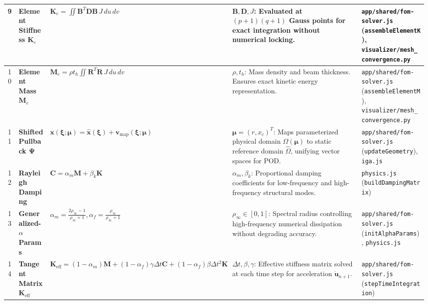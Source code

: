 \begin{landscape}
\begin{center}
\begin{longtable}{|c|p{3.5cm}|p{6cm}|p{6cm}|p{6cm}|}
9 & \textbf{Element Stiffness $\mathbf{K}_e$} & $\mathbf{K}_e = \iint \mathbf{B}^T \mathbf{D} \mathbf{B} \, J \, du \, dv$ & $\mathbf{B}, \mathbf{D}, J$: Evaluated at $(p+1)(q+1)$ Gauss points for exact integration without numerical locking. & \texttt{app/shared/fom-solver.js} (\texttt{assembleElementK}), \texttt{visualizer/mesh\_convergence.py} \\
\hline

10 & \textbf{Element Mass $\mathbf{M}_e$} & $\mathbf{M}_e = \rho t_h \iint \mathbf{R}^T \mathbf{R} \, J \, du \, dv$ & $\rho, t_h$: Mass density and beam thickness. Ensures exact kinetic energy representation. & \texttt{app/shared/fom-solver.js} (\texttt{assembleElementM}), \texttt{visualizer/mesh\_convergence.py} \\
\hline

11 & \textbf{Shifted Pullback $\boldsymbol{\Psi}$} & $\mathbf{x}(\boldsymbol{\xi}; \boldsymbol{\mu}) = \hat{\mathbf{x}}(\boldsymbol{\xi}) + \mathbf{v}_{\text{map}}(\boldsymbol{\xi}; \boldsymbol{\mu})$ & $\boldsymbol{\mu} = (r, x_c)^T$: Maps parameterized physical domain $\Omega(\boldsymbol{\mu})$ to static reference domain $\hat{\Omega}$, unifying vector spaces for POD. & \texttt{app/shared/fom-solver.js} (\texttt{updateGeometry}), \texttt{iga.js} \\
\hline

12 & \textbf{Rayleigh Damping} & $\mathbf{C} = \alpha_m \mathbf{M} + \beta_k \mathbf{K}$ & $\alpha_m, \beta_k$: Proportional damping coefficients for low-frequency and high-frequency structural modes. & \texttt{physics.js} (\texttt{buildDampingMatrix}) \\
\hline

13 & \textbf{Generalized-$\alpha$ Params} & $\alpha_m = \frac{2\rho_\infty-1}{\rho_\infty+1}, \alpha_f = \frac{\rho_\infty}{\rho_\infty+1}$ & $\rho_\infty \in [0, 1]$: Spectral radius controlling high-frequency numerical dissipation without degrading accuracy. & \texttt{app/shared/fom-solver.js} (\texttt{initAlphaParams}), \texttt{physics.js} \\
\hline

14 & \textbf{Tangent Matrix $\mathbf{K}_{\text{eff}}$} & $\mathbf{K}_{\text{eff}} = (1-\alpha_m)\mathbf{M} + (1-\alpha_f)\gamma\Delta t\mathbf{C} + (1-\alpha_f)\beta\Delta t^2\mathbf{K}$ & $\Delta t, \beta, \gamma$: Effective stiffness matrix solved at each time step for acceleration $\ddot{\mathbf{u}}_{n+1}$. & \texttt{app/shared/fom-solver.js} (\texttt{stepTimeIntegration}) \\
\hline


\end{longtable}
\end{center}
\end{landscape}
